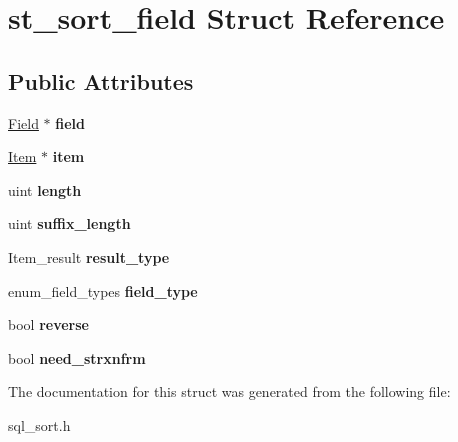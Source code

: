 \hypertarget{structst__sort__field}{}\section{st\+\_\+sort\+\_\+field Struct Reference}
\label{structst__sort__field}
\subsection*{Public Attributes}
\begin{DoxyCompactItemize}
\item 
\mbox{\label{structst__sort__field_a8eb3ac7a8e0e25ad840bfd818e9b7783}} 
\mbox{\hyperlink{classField}{Field}} $\ast$ {\bfseries field}
\item 
\mbox{\label{structst__sort__field_a32d3bc57b41ed46c0b2ed4d667b35eaa}} 
\mbox{\hyperlink{classItem}{Item}} $\ast$ {\bfseries item}
\item 
\mbox{\label{structst__sort__field_aeb1cdf77839b6c3170055ad66954f723}} 
uint {\bfseries length}
\item 
\mbox{\label{structst__sort__field_a835d3344d529c2b1109bf46bfd5ebb83}} 
uint {\bfseries suffix\+\_\+length}
\item 
\mbox{\label{structst__sort__field_a3ed5b5d9cfb584317d9c9f337a1d9b35}} 
Item\+\_\+result {\bfseries result\+\_\+type}
\item 
\mbox{\label{structst__sort__field_ac339691264bf152bd20852cbcd4e44f8}} 
enum\+\_\+field\+\_\+types {\bfseries field\+\_\+type}
\item 
\mbox{\label{structst__sort__field_a752af8f5b2384a529c184a140dc0454d}} 
bool {\bfseries reverse}
\item 
\mbox{\label{structst__sort__field_a712619dbe3ea3e4d83ccc815caef558e}} 
bool {\bfseries need\+\_\+strxnfrm}
\end{DoxyCompactItemize}


The documentation for this struct was generated from the following file\+:\begin{DoxyCompactItemize}
\item 
sql\+\_\+sort.\+h\end{DoxyCompactItemize}
